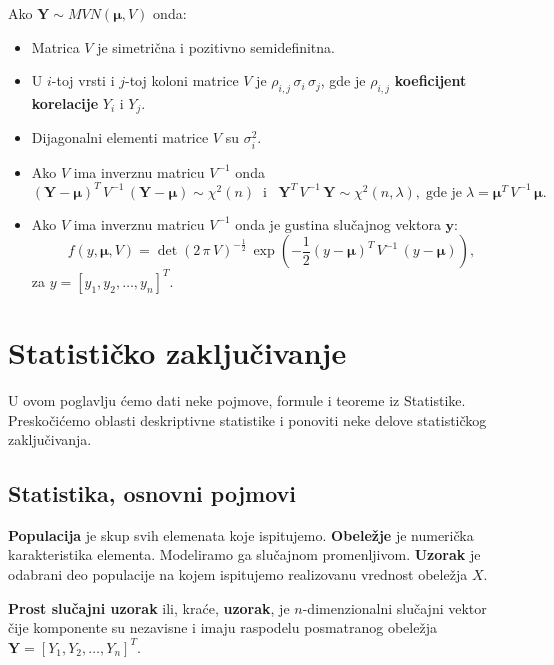 \documentclass[twoside,titlepage,12pt,a4paper]{book}
\numberwithin{equation}{chapter}
\begin{document}
Ako $\mathbf{Y} \sim MVN ( \boldsymbol{\mu}, V )$ onda:
\begin{itemize}
\item Matrica $V$ je simetrična i pozitivno semidefinitna.
\item U $i$-toj vrsti i $j$-toj koloni matrice $V$ je $\rho_{i,j} \, \sigma_i \, \sigma_j$, gde je $\rho_{i,j}$ \textbf{koeficijent korelacije} $Y_i$ i $Y_j$.
\item Dijagonalni elementi matrice $V$ su $\sigma_i^2$.
\item Ako $V$ ima inverznu matricu $V^{-1}$ onda
\[
( \mathbf{Y} - \boldsymbol{\mu} )^T \, V^{-1} \, ( \mathbf{Y} - \boldsymbol{\mu} )
\sim \chi^2 ( n ) \;\;\mbox{i}\;\;\;
\mathbf{Y}^T \, V^{-1} \, \mathbf{Y} \sim \chi^2 ( n, \lambda ),
\;\mbox{gde je}\; \lambda = \boldsymbol{\mu}^T \, V^{-1} \, \boldsymbol{\mu}.
\]
\item Ako $V$ ima inverznu matricu $V^{-1}$ onda je gustina slučajnog vektora $\mathbf{y}$:
$$\displaystyle f ( y, \boldsymbol{\mu}, V ) =  \det(2 \, \pi \, V)^{-{\frac{1}{2}}} \, \exp\left(-{\frac{1}{2}}(y - \boldsymbol{\mu})^{T} \, V^{-1} \, (y - \boldsymbol{\mu})\right),$$
za $y = [ y_1, y_2, \ldots, y_n ]^T$.
\end{itemize}


\chapter{Statističko zaključivanje}

U ovom poglavlju ćemo dati neke pojmove, formule i teoreme iz Statistike. Preskočićemo oblasti deskriptivne statistike i ponoviti neke delove statističkog zaključivanja.

\section{Statistika, osnovni pojmovi}

\textbf{Populacija} je skup svih elemenata koje ispitujemo.
\textbf{Obeležje} je numerička karakteristika elementa. Modeliramo
ga slučajnom promenljivom.
\textbf{Uzorak} je odabrani deo populacije na kojem ispitujemo
realizovanu vrednost obeležja $X$.

\textbf{Prost slučajni uzorak} ili, kraće, \textbf{uzorak}, je $n$-dimenzionalni slučajni vektor čije komponente su nezavisne i imaju raspodelu posmatranog obeležja $\mathbf{Y} = [ Y_1, Y_2, \ldots, Y_n ]^T$. 
\end{document}
